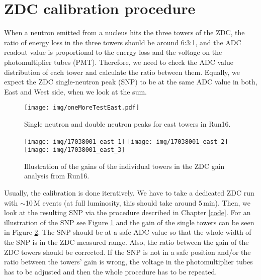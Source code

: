 \section{ZDC calibration procedure}

When a neutron emitted from a nucleus hits the three towers of the ZDC, the ratio of energy loss
in the three towers should be 
around 6:3:1, and the ADC readout value is proportional to the energy loss and the voltage on the
photomultiplier tubes (PMT)\@. Therefore, we need to check the ADC value 
distribution of each tower and calculate the ratio between them. Equally, we expect the ZDC 
single-neutron peak (SNP) to
be at the same ADC value in both, East and West side, when we look at the sum.

\begin{figure}[htb]
\begin{center}
\texttt{[image: img/oneMoreTestEast.pdf]}
\end{center}
\caption{\label{SNPillustration} Single neutron and double neutron peaks for east towers in Run16.}

\end{figure}

\begin{figure}[htb]
\begin{center}
\texttt{[image: img/17038001\_east\_1]}
\texttt{[image: img/17038001\_east\_2]}
\texttt{[image: img/17038001\_east\_3]}
\end{center}
\caption{\label{gain}Illustration of the gains of the individual towers in the ZDC gain analysis from Run16.}

\end{figure}

Usually, the calibration is done iteratively. We have to take a dedicated ZDC run with
$\sim$10$\,$M events (at full luminosity, this should take around $5\,$min). Then, we
look at the resulting SNP via the procedure described in Chapter \ref{code}.
For an illustration of the SNP see Figure \ref{SNPillustration} and the gain of the single
towers can be seen in Figure \ref{gain}.
The SNP should be at a safe ADC value so that the whole width of the SNP is in the ZDC measured
range. Also, the ratio between the gain of the ZDC towers should be corrected. If the
SNP is not in a safe position and/or the ratio between the towers' gain is wrong,
the voltage in the photomultiplier tubes has to be adjusted and then the whole procedure
has to be repeated.

